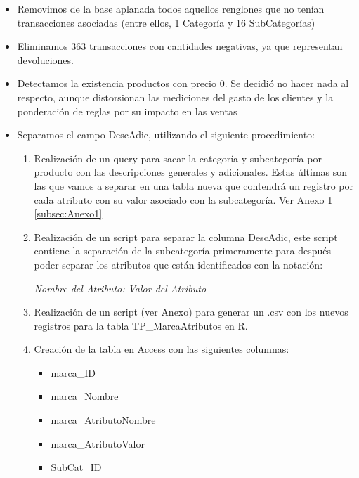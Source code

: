 \documentclass[]{article}
\begin{document}
\begin{itemize}
		\item Removimos de la base aplanada todos aquellos renglones que no tenían transacciones asociadas (entre ellos, 1 Categoría y 16 SubCategorías)
		\item Eliminamos 363 transacciones con cantidades negativas, ya que representan devoluciones.
		\item Detectamos la existencia productos con precio 0. Se decidió no hacer nada al respecto, aunque distorsionan las mediciones del gasto de los clientes y la ponderación de reglas por su impacto en las ventas
		\item Separamos el campo DescAdic, utilizando el siguiente procedimiento:
		\begin{enumerate}
			\item Realización de un query para sacar la categoría y subcategoría por producto con las descripciones generales y adicionales.  Estas últimas son las que vamos a separar en una tabla nueva que contendrá un registro por cada atributo con su valor asociado con la subcategoría. Ver Anexo 1 \ref{subsec:Anexo1}
			
			\item Realización de un script para separar la columna DescAdic, este script contiene la separación de la subcategoría primeramente para después poder separar los atributos que están identificados con la notación:
			\begin{center}
				\textit{Nombre del Atributo: Valor del Atributo}		
			\end{center}
			
			\item Realización de un script (ver Anexo) para generar un .csv con los nuevos registros para la tabla TP\_MarcaAtributos en R.
			
			\item Creación de la tabla en Access con las siguientes columnas:
			\begin{itemize}
				\item marca\_ID
				\item marca\_Nombre
				\item marca\_AtributoNombre
				\item marca\_AtributoValor
				\item SubCat\_ID	
			\end{itemize}	
			
		\end{enumerate}
		
		
	\end{itemize}
	
\end{document}

